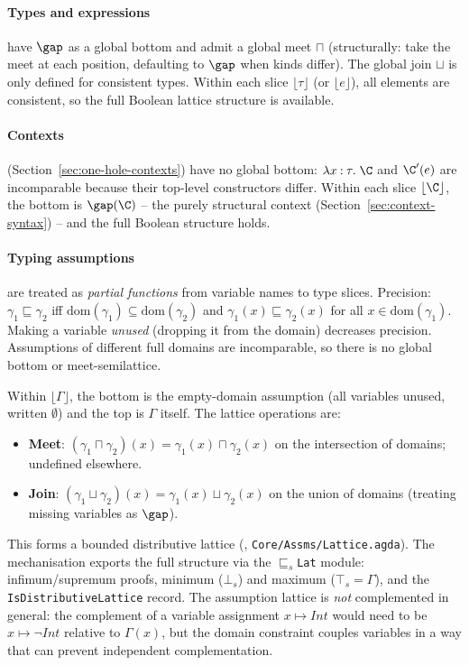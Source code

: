 \paragraph{Types and expressions} have $\gap$ as a global bottom and admit a global meet $\sqcap$ (structurally: take the meet at each position, defaulting to $\gap$ when kinds differ). The global join $\sqcup$ is only defined for consistent types. Within each slice $\lfloor\tau\rfloor$ (or $\lfloor e \rfloor$), all elements are consistent, so the full Boolean lattice structure is available.

\paragraph{Contexts} (Section~\ref{sec:one-hole-contexts}) have no global bottom: $\lambda x \mathbin{:} \tau.\; \C$ and $\C'(e)$ are incomparable because their top-level constructors differ. Within each slice $\lfloor\C\rfloor$, the bottom is $\gap(\C)$ -- the purely structural context (Section~\ref{sec:context-syntax}) -- and the full Boolean structure holds.

\paragraph{Typing assumptions} are treated as \textit{partial functions} from variable names to type slices. Precision: $\gamma_1 \sqsubseteq \gamma_2$ iff $\mathrm{dom}(\gamma_1) \subseteq \mathrm{dom}(\gamma_2)$ and $\gamma_1(x) \sqsubseteq \gamma_2(x)$ for all $x \in \mathrm{dom}(\gamma_1)$. Making a variable \textit{unused} (dropping it from the domain) decreases precision. Assumptions of different full domains are incomparable, so there is no global bottom or meet-semilattice.

Within $\lfloor\Gamma\rfloor$, the bottom is the empty-domain assumption (all variables unused, written $\emptyset$) and the top is $\Gamma$ itself. The lattice operations are:
\begin{itemize}
\item \textbf{Meet}: $(\gamma_1 \sqcap \gamma_2)(x) = \gamma_1(x) \sqcap \gamma_2(x)$ on the intersection of domains; undefined elsewhere.
\item \textbf{Join}: $(\gamma_1 \sqcup \gamma_2)(x) = \gamma_1(x) \sqcup \gamma_2(x)$ on the union of domains (treating missing variables as $\gap$).
\end{itemize}
This forms a bounded distributive lattice (\yo, \texttt{Core/Assms/Lattice.agda}). The mechanisation exports the full structure via the \texttt{$\sqsubseteq_s$Lat} module: infimum/supremum proofs, minimum ($\bot_s$) and maximum ($\top_s = \Gamma$), and the \texttt{IsDistributiveLattice} record. The assumption lattice is \textit{not} complemented in general: the complement of a variable assignment $x \mapsto \mathit{Int}$ would need to be $x \mapsto \neg\mathit{Int}$ relative to $\Gamma(x)$, but the domain constraint couples variables in a way that can prevent independent complementation.

